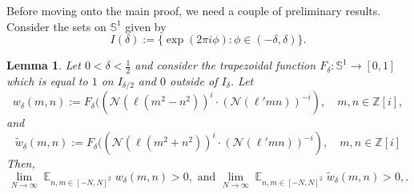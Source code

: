 \documentclass[11pt]{amsart}
\newtheorem{lemma}{Lemma}[section]
\theoremstyle{definition}
\DeclareMathOperator*{\E}{\mathbb{E}}
\newcommand{\NN}{{\mathcal N}}
\renewcommand{\S}{\mathbb{S}}
\newcommand{\Z}{{\mathbb Z}}
\begin{document}
Before moving onto the main proof, we need a couple of preliminary results. Consider the sets on $\S^1$ given by
\[
I(\delta):=\{\exp(2\pi i\phi) : \phi \in (-\delta,\delta)\}.
\]
\begin{lemma}\label{weights}
Let $0<\delta<\frac{1}{2}$ and consider the trapezoidal function $F_{\delta}: \S^1 \to [0,1]$ which is equal to $1$ on $I_{\delta/2}$ and $0$ outside of $I_{\delta}$. Let
\[
w_{\delta}(m,n):= F_{\delta}((\NN(\ell(m^2-n^2))^i\cdot (\NN(\ell'mn))^{-i}), \quad m, n \in \Z[i], 
\]
and
\begin{equation}\label{weight1}
\tilde{w}_{\delta}(m,n):= F_{\delta}((\NN(\ell(m^2+n^2))^i\cdot (\NN(\ell'mn))^{-i}), \quad m, n \in \Z[i]
\end{equation}
Then,
\begin{equation}\label{weight2}
\lim_{N \to \infty} \E_{n, m \in [-N,N]^2 } w_{\delta}(m,n)>0, \text{ and } \lim_{N \to \infty} \E_{n, m \in [-N,N]^2 } \tilde{w}_{\delta}(m,n)>0,.
\end{equation}
\end{lemma}
\end{document}
